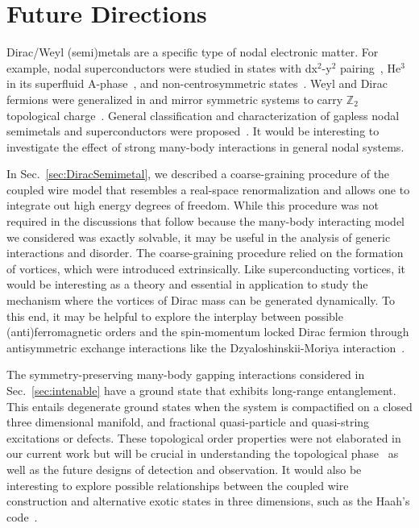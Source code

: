\chapter{Future Directions}\label{chap:Future}

Dirac/Weyl (semi)metals are a specific type of nodal electronic matter. For example, nodal superconductors were studied in states with dx$^2$-y$^2$ pairing~\cite{RyuHatsugaiPRL02}, He$^3$ in its superfluid A-phase~\cite{Volovik3HeA,Volovikbook}, and non-centrosymmetric states~\cite{SchnyderRyuFlat,BrydonSchnyderTimmFlat}. Weyl and Dirac fermions were generalized in \TR and mirror symmetric systems to carry $\mathbb{Z}_2$ topological charge~\cite{morimotoFurusakiPRB14}. General classification and characterization of gapless nodal semimetals and superconductors were proposed~\cite{Sato_Crystalline_PRB14,ZhaoWangPRL13,ZhaoWangPRB14,ChiuSchnyder14,matsuuraNJP13,Volovikbook,RMP,HoravaPRL05}. It would be interesting to investigate the effect of strong many-body interactions in general nodal systems.

In Sec.~\ref{sec:DiracSemimetal}, we described a coarse-graining procedure of the coupled wire model that resembles a real-space renormalization and allows one to integrate out high energy degrees of freedom. While this procedure was not required in the discussions that follow because the many-body interacting model we considered was exactly solvable, it may be useful in the analysis of generic interactions and disorder. The coarse-graining procedure relied on the formation of vortices, which were introduced extrinsically. Like superconducting vortices, it would be interesting as a theory and essential in application to study the mechanism where the vortices of Dirac mass can be generated dynamically. To this end, it may be helpful to explore the interplay between possible (anti)ferromagnetic orders and the spin-momentum locked Dirac fermion through antisymmetric exchange interactions like the Dzyaloshinskii-Moriya interaction~\cite{Dzyaloshinsky58,Moriya60}.

The symmetry-preserving many-body gapping interactions considered in Sec.~\ref{sec:intenable} have a ground state that exhibits long-range entanglement. This entails degenerate ground states when the system is compactified on a closed three dimensional manifold, and fractional quasi-particle and quasi-string excitations or defects. These topological order properties were not elaborated in our current work but will be crucial in understanding the topological phase~\cite{SirotaRazaTeoappearsoon} as well as the future designs of detection and observation. It would also be interesting to explore possible relationships between the coupled wire construction and alternative exotic states in three dimensions, such as the Haah's code~\cite{Haah11,Haah13}.

